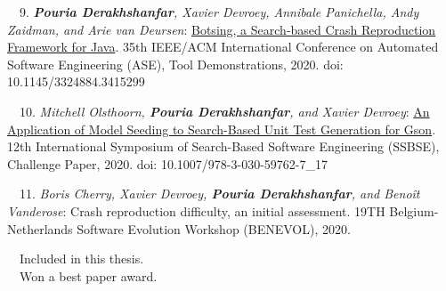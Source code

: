 \begin{etaremune}{\small
    \item[~~9.] \emph{\textbf{Pouria Derakhshanfar}, Xavier Devroey, Annibale Panichella, Andy Zaidman, and Arie van Deursen}: 
        \href{https://research.tudelft.nl/en/publications/botsing-a-search-based-crash-reproduction-framework-for-java}{Botsing, a Search-based Crash Reproduction Framework for Java}.
        35th IEEE/ACM International Conference on Automated Software Engineering (ASE), Tool Demonstrations,
        2020. doi: 10.1145/3324884.3415299
}\end{etaremune}


\begin{etaremune}{\small
    \item[~~10.] \emph{Mitchell Olsthoorn, \textbf{Pouria Derakhshanfar}, and Xavier Devroey}: 
        \href{https://research.tudelft.nl/en/publications/an-application-of-model-seeding-to-search-based-unit-test-generat}{An Application of Model Seeding to Search-Based Unit Test Generation for Gson}.
        12th International Symposium of Search-Based Software Engineering (SSBSE), Challenge Paper,
        2020. doi: 10.1007/978-3-030-59762-7\_17
}\end{etaremune}

\begin{etaremune}{\small
    \item[~~11.] \emph{Boris Cherry, Xavier Devroey, \textbf{Pouria Derakhshanfar}, and Beno\^{i}t Vanderose}: 
        Crash reproduction difficulty, an initial assessment.
        19TH Belgium-Netherlands Software Evolution Workshop (BENEVOL),
        2020.
}\end{etaremune}
\noindent
\faFileTextO~~Included in this thesis.\\
\faTrophy~~Won a best paper award.
